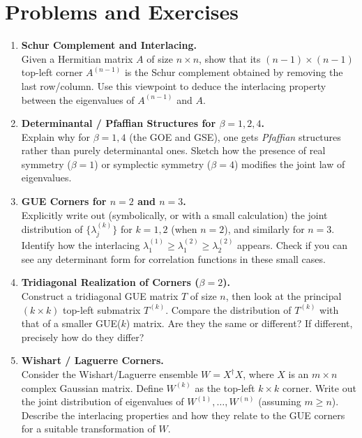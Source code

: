 \documentclass[letterpaper,11pt,oneside,reqno]{article}
\numberwithin{equation}{section}
\theoremstyle{definition}
\begin{document}
\section{Problems and Exercises}
\label{sec:problems}

\begin{enumerate}
\item \textbf{Schur Complement and Interlacing.} \\
Given a Hermitian matrix $A$ of size $n\times n$, show that its $(n-1)\times(n-1)$ top-left corner $A^{(n-1)}$ is the Schur complement obtained by removing the last row/column. Use this viewpoint to deduce the interlacing property between the eigenvalues of $A^{(n-1)}$ and $A$.
\medskip

\item \textbf{Determinantal / Pfaffian Structures for $\beta=1,2,4$.} \\
Explain why for $\beta=1,4$ (the GOE and GSE), one gets \emph{Pfaffian} structures rather than purely determinantal ones. Sketch how the presence of real symmetry ($\beta=1$) or symplectic symmetry ($\beta=4$) modifies the joint law of eigenvalues.
\medskip

\item \textbf{GUE Corners for $n=2$ and $n=3$.} \\
Explicitly write out (symbolically, or with a small calculation) the joint distribution of $\{\lambda^{(k)}_j\}$ for $k=1,2$ (when $n=2$), and similarly for $n=3$. Identify how the interlacing $\lambda_1^{(1)}\ge \lambda_1^{(2)}\ge \lambda_2^{(2)}$ appears. Check if you can see any determinant form for correlation functions in these small cases.
\medskip

\item \textbf{Tridiagonal Realization of Corners ($\beta=2$).} \\
Construct a tridiagonal GUE matrix $T$ of size $n$, then look at the principal $(k\times k)$ top-left submatrix $T^{(k)}$. Compare the distribution of $T^{(k)}$ with that of a smaller GUE(\!$k$) matrix. Are they the same or different? If different, precisely how do they differ?
\medskip

\item \textbf{Wishart / Laguerre Corners.} \\
Consider the Wishart/Laguerre ensemble $W = X^\dagger X$, where $X$ is an $m\times n$ complex Gaussian matrix. Define $W^{(k)}$ as the top-left $k\times k$ corner. Write out the joint distribution of eigenvalues of $W^{(1)},\dots,W^{(n)}$ (assuming $m\ge n$). Describe the interlacing properties and how they relate to the GUE corners for a suitable transformation of $W$.
\medskip


\end{enumerate}
\end{document}
